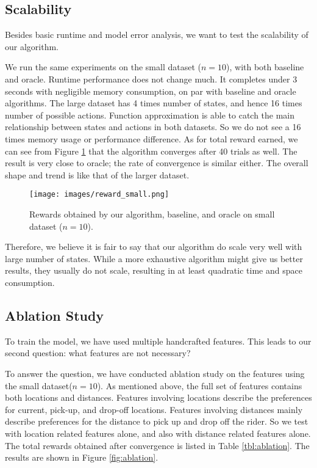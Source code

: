 \documentclass{article}
\begin{document}
\subsection{Scalability}

Besides basic runtime and model error analysis, we want to test the scalability of our algorithm.

We run the same experiments on the small dataset ($n=10$), with both baseline and oracle. Runtime performance does not change much. It completes under 3 seconds with negligible memory consumption, on par with baseline and oracle algorithms. The large dataset has 4 times number of states, and hence 16 times number of possible actions. Function approximation is able to catch the main relationship between states and actions in both datasets. So we do not see a 16 times memory usage or performance difference. As for total reward earned, we can see from Figure \ref{fig:reward_small} that the algorithm converges after 40 trials as well. The result is very close to oracle; the rate of convergence is similar either. The overall shape and trend is like that of the larger dataset.

\begin{figure}[!htb]
\begin{center}
\texttt{[image: images/reward\_small.png]}
\end{center}
\caption{Rewards obtained by our algorithm, baseline, and oracle on small dataset ($n=10$).}
\label{fig:reward_small}
\end{figure}

Therefore, we believe it is fair to say that our algorithm do scale very well with large number of states. While a more exhaustive algorithm might give us better results, they usually do not scale, resulting in at least quadratic time and space consumption.

\subsection{Ablation Study}

To train the model, we have used multiple handcrafted features. This leads to our second question: what features are not necessary?

To answer the question, we have conducted ablation study on the features using the small dataset($n=10$). As mentioned above, the full set of features contains both locations and distances. Features involving locations describe the preferences for current, pick-up, and drop-off locations. Features involving distances mainly describe preferences for the distance to pick up and drop off the rider. So we test with location related features alone, and also with distance related features alone. The total rewards obtained after convergence is listed in Table \ref{tbl:ablation}. The results are shown in Figure \ref{fig:ablation}.
\end{document}
